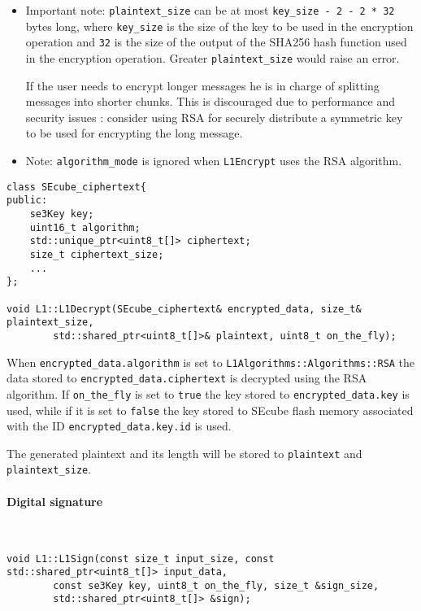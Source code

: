 \bigskip
\begin{itemize}
	\item Important note: \texttt{plaintext\_size} can be at most
		\texttt{key\_size - 2 - 2 * 32} bytes long, where
		\texttt{key\_size} is the size of the key to be used in the
		encryption operation and \texttt{32} is the size of the output
		of the SHA256 hash function used in the encryption operation.
		Greater \texttt{plaintext\_size} would raise an error.

		If the user needs to encrypt longer messages he is in charge of
		splitting messages into shorter chunks.
		This is discouraged due to performance and security issues
		\cite{rsa_long_msg}: consider using RSA for securely distribute
		a symmetric key to be used for encrypting the long message.

	\item Note: \texttt{algorithm\_mode} is ignored when \texttt{L1Encrypt}
		uses the RSA algorithm.
\end{itemize}

\begin{lstlisting}
class SEcube_ciphertext{
public:
	se3Key key;
	uint16_t algorithm;
	std::unique_ptr<uint8_t[]> ciphertext;
	size_t ciphertext_size;
	...
};

void L1::L1Decrypt(SEcube_ciphertext& encrypted_data, size_t& plaintext_size,
        std::shared_ptr<uint8_t[]>& plaintext, uint8_t on_the_fly);
\end{lstlisting}

When \texttt{encrypted\_data.algorithm} is set to
\texttt{L1Algorithms::Algorithms::RSA} the data stored to
\texttt{encrypted\_data.ciphertext} is decrypted using the RSA algorithm.
If \texttt{on\_the\_fly} is set to \texttt{true} the key stored to
\texttt{encrypted\_data.key} is used, while if it is set to \texttt{false} the
key stored to SEcube flash memory associated with the ID
\texttt{encrypted\_data.key.id} is used.

The generated plaintext and its length will be stored to \texttt{plaintext} and
\texttt{plaintext\_size}.

\paragraph{Digital signature} \hspace{0pt} \\
\begin{lstlisting}
void L1::L1Sign(const size_t input_size, const std::shared_ptr<uint8_t[]> input_data,
		const se3Key key, uint8_t on_the_fly, size_t &sign_size,
		std::shared_ptr<uint8_t[]> &sign);
\end{lstlisting}

